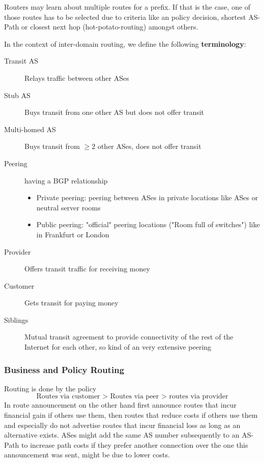Routers may learn about multiple routes for a prefix.
If that is the case, one of those routes has to be selected due to criteria like an policy decision, shortest AS-Path or closest next hop (hot-potato-routing) amongst others.\\
\vspace{5pt}

In the context of inter-domain routing, we define the following \textbf{terminology}:
\begin{description}
  \item[Transit AS] Relays traffic between other ASes
  \item[Stub AS] Buys transit from one other AS but does not offer transit
  \item[Multi-homed AS] Buys transit from $\geq 2$ other ASes, does not offer transit
  \item[Peering] having a BGP relationship
    \begin{itemize}
      \item Private peering: peering between ASes in private locations like ASes or neutral server rooms
      \item Public peering: "official" peering locations ("Room full of switches") like in Frankfurt or London
    \end{itemize}
  \item[Provider] Offers transit traffic for receiving money
  \item[Customer] Gets transit for paying money
  \item[Siblings] Mutual transit agreement to provide connectivity of the rest of the Internet for each other, so kind of an very extensive peering
\end{description}

\subsubsection*{Business and Policy Routing}
Routing is done by the policy
\begin{equation*}
  \text{Routes via customer > Routes via peer > routes via provider}
\end{equation*}
In route announcement on the other hand first announce routes that incur financial gain if others use them, then routes that reduce costs if others use them and especially do not advertise routes that incur financial loss as long as an alternative exists.
ASes might add the same AS number subsequently to an AS-Path to increase path costs if they prefer another connection over the one this announcement was sent, might be due to lower costs.

